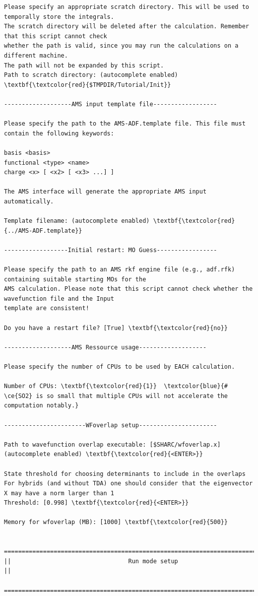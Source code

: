 \documentclass[a4paper,11pt,DIV=15,openany]{scrbook}
\begin{document}
\begin{oframed}
\begin{Verbatim}[commandchars=\\\{\}]
Please specify an appropriate scratch directory. This will be used to temporally store the integrals. 
The scratch directory will be deleted after the calculation. Remember that this script cannot check 
whether the path is valid, since you may run the calculations on a different machine. 
The path will not be expanded by this script.
Path to scratch directory: (autocomplete enabled) \textbf{\textcolor{red}{$TMPDIR/Tutorial/Init}}

-------------------AMS input template file------------------

Please specify the path to the AMS-ADF.template file. This file must contain the following keywords:

basis <basis>
functional <type> <name>
charge <x> [ <x2> [ <x3> ...] ]

The AMS interface will generate the appropriate AMS input automatically.

Template filename: (autocomplete enabled) \textbf{\textcolor{red}{../AMS-ADF.template}}

------------------Initial restart: MO Guess-----------------

Please specify the path to an AMS rkf engine file (e.g., adf.rfk) containing suitable starting MOs for the 
AMS calculation. Please note that this script cannot check whether the wavefunction file and the Input 
template are consistent!

Do you have a restart file? [True] \textbf{\textcolor{red}{no}} 

-------------------AMS Ressource usage-------------------

Please specify the number of CPUs to be used by EACH calculation.

Number of CPUs: \textbf{\textcolor{red}{1}}  \textcolor{blue}{# \ce{SO2} is so small that multiple CPUs will not accelerate the computation notably.}

-----------------------WFoverlap setup----------------------

Path to wavefunction overlap executable: [$SHARC/wfoverlap.x] (autocomplete enabled) \textbf{\textcolor{red}{<ENTER>}}

State threshold for choosing determinants to include in the overlaps
For hybrids (and without TDA) one should consider that the eigenvector X may have a norm larger than 1
Threshold: [0.998] \textbf{\textcolor{red}{<ENTER>}} 

Memory for wfoverlap (MB): [1000] \textbf{\textcolor{red}{500}}

  ================================================================================
||                                 Run mode setup                                 ||
  ================================================================================



\end{Verbatim}
\end{oframed}
\end{document}
